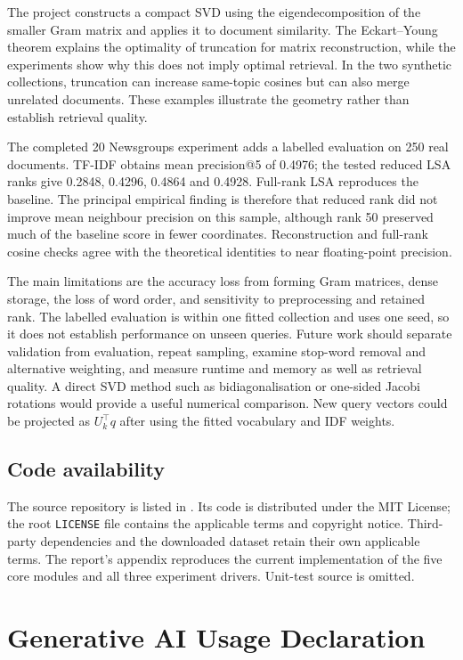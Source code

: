 \documentclass[12pt,a4paper]{report}
\newcommand{\T}{^{\top}}
\theoremstyle{plain}
\theoremstyle{definition}
\theoremstyle{remark}
\theoremstyle{definition}
\begin{document}
The project constructs a compact SVD using the eigendecomposition of the smaller Gram matrix and applies it to document similarity. The Eckart--Young theorem explains the optimality of truncation for matrix reconstruction, while the experiments show why this does not imply optimal retrieval. In the two synthetic collections, truncation can increase same-topic cosines but can also merge unrelated documents. These examples illustrate the geometry rather than establish retrieval quality.

The completed 20 Newsgroups experiment adds a labelled evaluation on 250 real documents. TF-IDF obtains mean precision@5 of 0.4976; the tested reduced LSA ranks give 0.2848, 0.4296, 0.4864 and 0.4928. Full-rank LSA reproduces the baseline. The principal empirical finding is therefore that reduced rank did not improve mean neighbour precision on this sample, although rank 50 preserved much of the baseline score in fewer coordinates. Reconstruction and full-rank cosine checks agree with the theoretical identities to near floating-point precision.

The main limitations are the accuracy loss from forming Gram matrices, dense storage, the loss of word order, and sensitivity to preprocessing and retained rank. The labelled evaluation is within one fitted collection and uses one seed, so it does not establish performance on unseen queries. Future work should separate validation from evaluation, repeat sampling, examine stop-word removal and alternative weighting, and measure runtime and memory as well as retrieval quality. A direct SVD method such as bidiagonalisation or one-sided Jacobi rotations would provide a useful numerical comparison. New query vectors could be projected as $U_k\T q$ after using the fitted vocabulary and IDF weights.

\section*{Code availability}
The source repository is listed in \cite{repo}. Its code is distributed under the MIT License; the root \texttt{LICENSE} file contains the applicable terms and copyright notice. Third-party dependencies and the downloaded dataset retain their own applicable terms. The report's appendix reproduces the current implementation of the five core modules and all three experiment drivers. Unit-test source is omitted.

\chapter*{Generative AI Usage Declaration}
\end{document}
